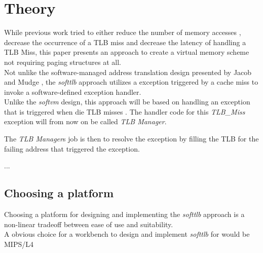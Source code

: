 \chapter{Theory}

\label{chap:theory}




While previous work tried to either reduce the number of memory accesses ,
decrease the occurrence of a TLB miss and decrease the latency of handling a TLB Miss, this paper
presents an approach to create a virtual memory scheme not requiring paging structures at all.\\

Not unlike the software-managed address translation design presented by Jacob and Mudge \cite{jacobSoftwaremanagedAddressTranslation1997},
the \textit{softtlb} approach utilizes a exception triggered by a cache miss to invoke a software-defined
exception handler.\\
Unlike the \textit{softvm} design, this approach will be based on handling an exception that is triggered
when die TLB misses .
The handler code for this \textit{TLB\_Miss} exception will from now on be called \textit{TLB Manager}.

The \textit{TLB Manager}s job is then to resolve the exception by filling the TLB for the failing address
that triggered the exception.

...

\section{Choosing a platform}
Choosing a platform for designing and implementing the \textit{softtlb} approach is a non-linear tradeoff between
ease of use and suitability.\\
A obvious choice for a workbench to design and implement \textit{softtlb} for would be MIPS/L4 \cite{heiserAnatomyHighPerformanceMicrokernel}


